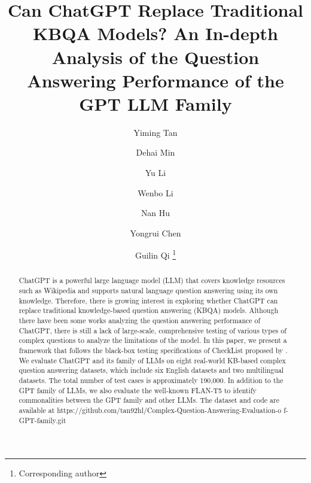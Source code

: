 \documentclass[runningheads]{llncs}
\begin{document}
\title{Can ChatGPT Replace Traditional KBQA Models? An In-depth Analysis of the Question Answering Performance of the GPT LLM Family}


\author{Yiming Tan  
\and Dehai Min  
\and Yu Li 
\and Wenbo Li  
\and Nan Hu 
\and Yongrui Chen  
\and  Guilin Qi  \footnote[2]{Corresponding author}
}
\renewcommand{\thefootnote} {\fnsymbol{footnote}}



 
\maketitle              


\begin{abstract} 
ChatGPT is a powerful large language model (LLM) that covers knowledge resources such as Wikipedia and supports natural language question answering using its own knowledge. Therefore, there is growing interest in exploring whether ChatGPT can replace traditional knowledge-based question answering (KBQA) models. Although there have been some works analyzing the question answering performance of ChatGPT, there is still a lack of large-scale, comprehensive testing of various types of complex questions to analyze the limitations of the model. In this paper, we present a framework that follows the black-box testing specifications of CheckList proposed by \cite{ribeiro2020beyond}. We evaluate ChatGPT and its family of LLMs on eight real-world KB-based complex question answering datasets, which include six English datasets and two multilingual datasets. The total number of test cases is approximately 190,000. In addition to the GPT family of LLMs, we also evaluate the well-known FLAN-T5 to identify commonalities between the GPT family and other LLMs. The dataset and code are available at https://github.com/tan92hl/Complex-Question-Answering-Evaluation-o
f-GPT-family.git

\end{abstract}
 
\end{document}
